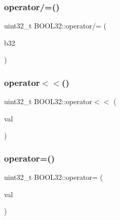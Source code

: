 \hypertarget{struct_b_o_o_l32_a042383be151078a1ca145690c338d075}{}\label{struct_b_o_o_l32_a042383be151078a1ca145690c338d075} 
\subsubsection{\texorpdfstring{operator/=()}{operator/=()}\hspace{0.1cm}{\footnotesize\ttfamily [2/2]}}
{\footnotesize\ttfamily uint32\+\_\+t B\+O\+O\+L32\+::operator/= (\begin{DoxyParamCaption}\item[{const \hyperlink{struct_b_o_o_l32}{B\+O\+O\+L32}}]{b32 }\end{DoxyParamCaption})\hspace{0.3cm}{\ttfamily [inline]}}

\hypertarget{struct_b_o_o_l32_a8c7d57fe8f56815e031bfa2124a6494c}{}\label{struct_b_o_o_l32_a8c7d57fe8f56815e031bfa2124a6494c} 
\subsubsection{\texorpdfstring{operator$<$$<$()}{operator<<()}}
{\footnotesize\ttfamily uint32\+\_\+t B\+O\+O\+L32\+::operator$<$$<$ (\begin{DoxyParamCaption}\item[{const uint32\+\_\+t}]{val }\end{DoxyParamCaption})\hspace{0.3cm}{\ttfamily [inline]}}

\hypertarget{struct_b_o_o_l32_ab582d5fba135322358f803b380a39d65}{}\label{struct_b_o_o_l32_ab582d5fba135322358f803b380a39d65} 
\subsubsection{\texorpdfstring{operator=()}{operator=()}}
{\footnotesize\ttfamily uint32\+\_\+t B\+O\+O\+L32\+::operator= (\begin{DoxyParamCaption}\item[{const uint32\+\_\+t}]{val }\end{DoxyParamCaption})\hspace{0.3cm}{\ttfamily [inline]}}

